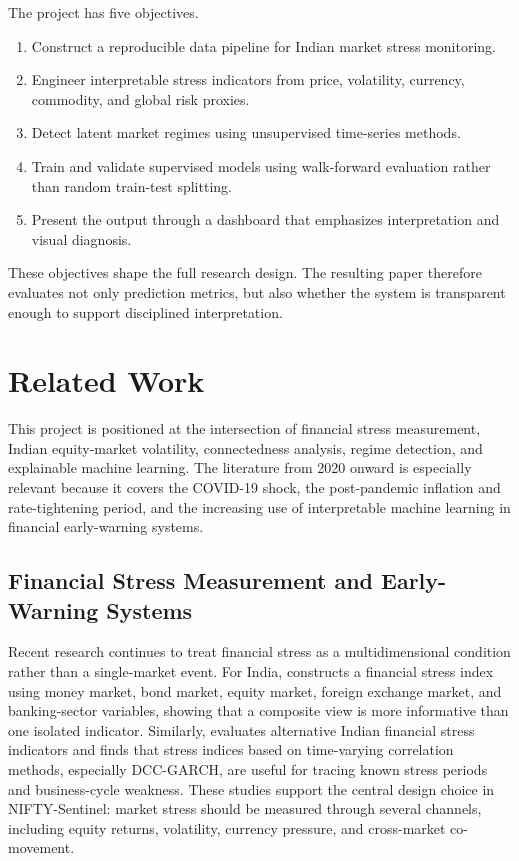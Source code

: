 \documentclass[12pt,a4paper]{article}
\begin{document}
The project has five objectives.

\begin{enumerate}
    \item Construct a reproducible data pipeline for Indian market stress monitoring.
    \item Engineer interpretable stress indicators from price, volatility, currency, commodity, and global risk proxies.
    \item Detect latent market regimes using unsupervised time-series methods.
    \item Train and validate supervised models using walk-forward evaluation rather than random train-test splitting.
    \item Present the output through a dashboard that emphasizes interpretation and visual diagnosis.
\end{enumerate}

These objectives shape the full research design. The resulting paper therefore evaluates not only prediction metrics, but also whether the system is transparent enough to support disciplined interpretation.

\section{Related Work}

This project is positioned at the intersection of financial stress measurement, Indian equity-market volatility, connectedness analysis, regime detection, and explainable machine learning. The literature from 2020 onward is especially relevant because it covers the COVID-19 shock, the post-pandemic inflation and rate-tightening period, and the increasing use of interpretable machine learning in financial early-warning systems.

\subsection{Financial Stress Measurement and Early-Warning Systems}

Recent research continues to treat financial stress as a multidimensional condition rather than a single-market event. For India, \citet{sahoo2021indiafsi} constructs a financial stress index using money market, bond market, equity market, foreign exchange market, and banking-sector variables, showing that a composite view is more informative than one isolated indicator. Similarly, \citet{jfep2020indiafsi} evaluates alternative Indian financial stress indicators and finds that stress indices based on time-varying correlation methods, especially DCC-GARCH, are useful for tracing known stress periods and business-cycle weakness. These studies support the central design choice in NIFTY-Sentinel: market stress should be measured through several channels, including equity returns, volatility, currency pressure, and cross-market co-movement.
\end{document}
